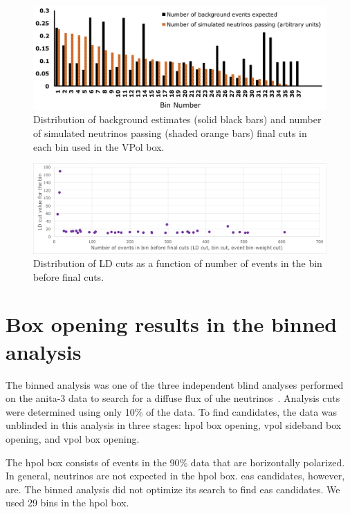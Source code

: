 \begin{figure}
\centering
\includegraphics[width=1.0\textwidth]{figures/background_simpassing_vpol_bins.pdf}
\caption{Distribution of background estimates (solid black bars) and number of simulated neutrinos passing (shaded orange bars) final cuts in each bin used in the VPol box. }
\label{bg_est}
\end{figure}


\begin{figure}
\centering
\includegraphics[width=1.0\textwidth]{figures/LDcutVsEventPopulationBeforeFinalCuts.png}
\caption{Distribution of LD cuts as a function of number of events in the bin before final cuts. }
\label{ldcut_pop}
\end{figure}


\section{Box opening results in the binned analysis}

The binned analysis was one of the three independent blind analyses performed on the \gls{anita}-3 data to search for a diffuse flux of \gls{uhe} neutrinos~\cite{diffuse}. Analysis cuts were determined using only 10\% of the data. To find candidates, the data was unblinded in this analysis in three stages: \gls{hpol} box opening, \gls{vpol} sideband box opening, and \gls{vpol} box opening. 

The \gls{hpol} box consists of events in the 90\% data that are horizontally polarized. In general, neutrinos are not expected in the \gls{hpol} box. \gls{eas} candidates, however, are. The binned analysis did not optimize its search to find \gls{eas} candidates. We used 29 bins in the \gls{hpol} box. 

